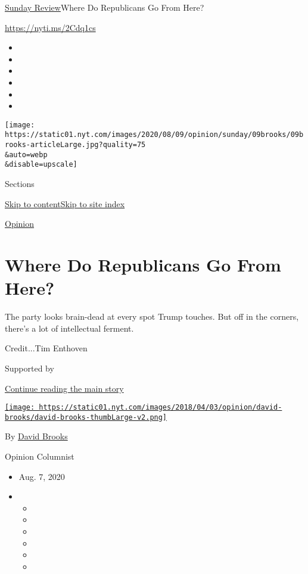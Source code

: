 \href{/section/opinion/sunday}{Sunday Review}\textbar{}Where Do
Republicans Go From Here?

\href{https://nyti.ms/2Cdq1cs}{https://nyti.ms/2Cdq1cs}

\begin{itemize}
\item
\item
\item
\item
\item
\item
\end{itemize}

\texttt{[image: https://static01.nyt.com/images/2020/08/09/opinion/sunday/09brooks/09brooks-articleLarge.jpg?quality=75\\\&auto=webp\\\&disable=upscale]}

Sections

\protect\hyperlink{site-content}{Skip to
content}\protect\hyperlink{site-index}{Skip to site index}

\href{/section/opinion}{Opinion}

\hypertarget{where-do-republicans-go-from-here}{%
\section{Where Do Republicans Go From
Here?}\label{where-do-republicans-go-from-here}}

The party looks brain-dead at every spot Trump touches. But off in the
corners, there's a lot of intellectual ferment.

Credit...Tim Enthoven

Supported by

\protect\hyperlink{after-sponsor}{Continue reading the main story}

\href{https://www.nytimes.com/by/david-brooks}{\texttt{[image: https://static01.nyt.com/images/2018/04/03/opinion/david-brooks/david-brooks-thumbLarge-v2.png]}}

By \href{https://www.nytimes.com/by/david-brooks}{David Brooks}

Opinion Columnist

\begin{itemize}
\item
  Aug. 7, 2020
\item
  \begin{itemize}
  \item
  \item
  \item
  \item
  \item
  \item
  \end{itemize}
\end{itemize}

